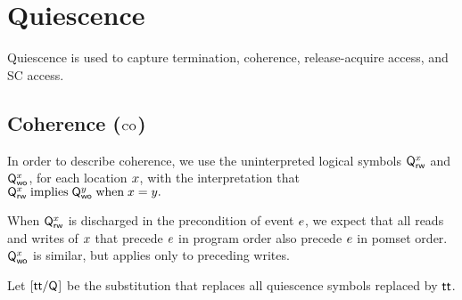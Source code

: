 \section{Quiescence}
\label{sec:q}

Quiescence is used to capture termination, coherence, release-acquire access,
and SC access.


\subsection{Coherence (${\textsc{co}}$)}
\label{sec:co}


In order to describe coherence, we use the uninterpreted logical symbols
$\mathsf{Q}_{\mathsf{rw}}^{x}$ and $\mathsf{Q}_{\mathsf{wo}}^{x}$, for each location $x$, with the
interpretation that
\begin{math}
  \mathsf{Q}_{\mathsf{rw}}^{x} \; \allowbreak\text{implies}\allowbreak\; \mathsf{Q}_{\mathsf{wo}}^{y} \;\allowbreak\text{when}\allowbreak\; x=y.
\end{math}

When $\mathsf{Q}_{\mathsf{rw}}^{x}$ is discharged in the precondition of event $e$, we
expect that all reads and writes of $x$ that precede $e$ in program
order also precede $e$ in pomset order.
$\mathsf{Q}_{\mathsf{wo}}^{x}$ is similar, but applies only to preceding writes.

\begin{definition}
  Let $[\mathsf{tt}/\mathsf{Q}_{}]$ be the substitution that replaces all quiescence
  symbols replaced by $\mathsf{tt}$.
\end{definition}

